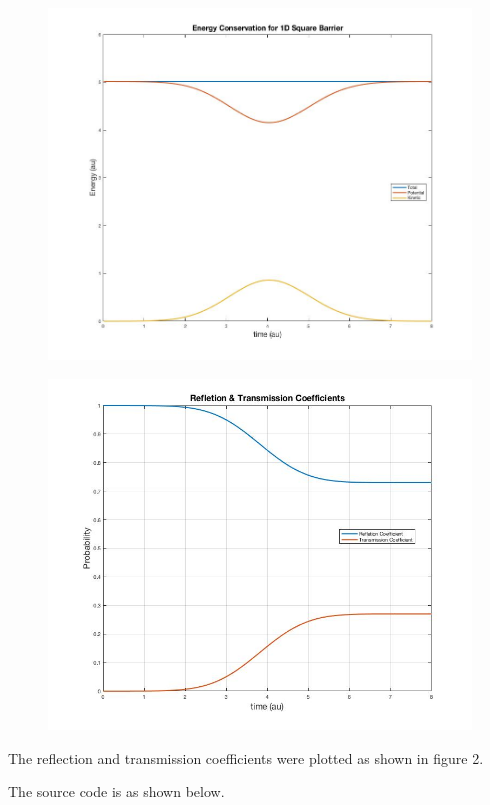 \documentclass[11pt, oneside]{article}   	%
\begin{document}
\begin{figure}[!htbp]
\centering
\includegraphics[scale=0.32]{energyPlot.jpg}
\caption{}
\end{figure}

\begin{figure}[!htbp]
\centering
\includegraphics[scale=0.37]{coeffPlot.jpg}
\caption{}
\end{figure}

The reflection and transmission coefficients were plotted as shown in figure 2.

\pagebreak
The source code is as shown below.

\end{document}
